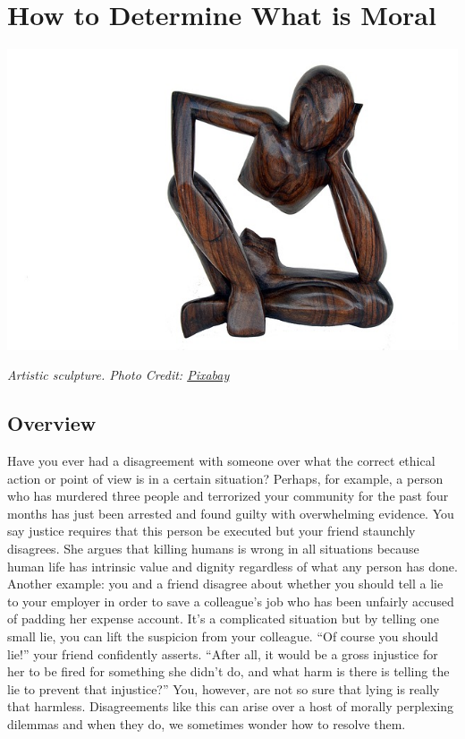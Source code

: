 \documentclass[
]{book}
\begin{document}
\hypertarget{how-to-determine-what-is-moral}{%
\chapter{How to Determine What is Moral}\label{how-to-determine-what-is-moral}}

\includegraphics{assets/unit_4/thinker-1294493_640.jpg}

\emph{Artistic sculpture. Photo Credit: \href{https://pixabay.com/en/thinker-at-a-loss-consider-play-1294493/}{Pixabay}}

\hypertarget{overview-3}{%
\section*{Overview}\label{overview-3}}

Have you ever had a disagreement with someone over what the correct ethical
action or point of view is in a certain situation? Perhaps, for example, a
person who has murdered three people and terrorized your community for the past
four months has just been arrested and found guilty with overwhelming evidence.
You say justice requires that this person be executed but your friend staunchly
disagrees. She argues that killing humans is wrong in all situations because
human life has intrinsic value and dignity regardless of what any person has
done.
Another example: you and a friend disagree about whether you should tell a lie to your employer in order to save a colleague's job who has been unfairly accused of padding her expense account. It's a complicated situation but by telling one small lie, you can lift the suspicion from your colleague. ``Of course you should lie!'' your friend confidently asserts. ``After all, it would be a gross injustice for her to be fired for something she didn't do, and what harm is there is telling the lie to prevent that injustice?'' You, however, are not so sure that lying is really that harmless.
Disagreements like this can arise over a host of morally perplexing dilemmas and when they do, we sometimes wonder how to resolve them.
\end{document}
